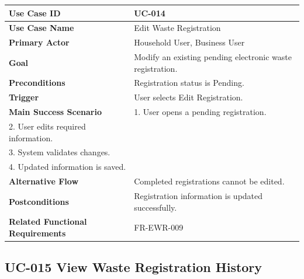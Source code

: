 \begin{longtable}{|p{4cm}|p{10cm}|}

\hline
\textbf{Use Case ID} &
UC-014 \\
\hline

\textbf{Use Case Name} &
Edit Waste Registration \\
\hline

\textbf{Primary Actor} &
Household User, Business User \\
\hline

\textbf{Goal} &
Modify an existing pending electronic waste registration. \\
\hline

\textbf{Preconditions} &
Registration status is Pending. \\
\hline

\textbf{Trigger} &
User selects Edit Registration. \\
\hline

\textbf{Main Success Scenario} &
1. User opens a pending registration.\\
2. User edits required information.\\
3. System validates changes.\\
4. Updated information is saved.\\
\hline

\textbf{Alternative Flow} &
Completed registrations cannot be edited.\\
\hline

\textbf{Postconditions} &
Registration information is updated successfully.\\
\hline

\textbf{Related Functional Requirements} &
FR-EWR-009 \\
\hline

\end{longtable}

\subsection{UC-015 View Waste Registration History}

